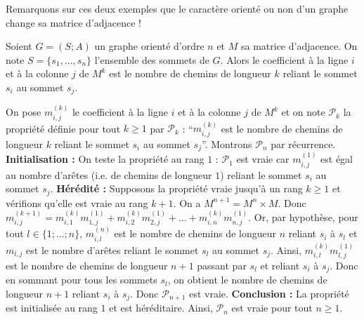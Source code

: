 	Remarquons sur ces deux exemples que le caractère orienté ou non d'un graphe change sa matrice d'adjacence !

	\begin{formula}
		Soient $G = (S; A)$ un graphe orienté d'ordre $n$ et $M$ sa matrice d'adjacence. On note $S = \{s_1, \dots, s_n\}$ l'ensemble des sommets de $G$.
		\newpar
		Alors le coefficient à la ligne $i$ et à la colonne $j$ de $M^k$ est le nombre de chemins de longueur $k$ reliant le sommet $s_i$ au sommet $s_j$.
	\end{formula}

	\begin{demonstration}
		On pose $m_{i,j}^{(k)}$ le coefficient à la ligne $i$ et à la colonne $j$ de $M^k$ et on note $\mathcal{P}_k$ la propriété définie pour tout $k \geq 1$ par $\mathcal{P}_k$ : ``$m_{i,j}^{(k)}$ est le nombre de chemins de longueur $k$ reliant le sommet $s_i$ au sommet $s_j$''. Montrons $\mathcal{P}_n$ par récurrence.
		\newpar
		\textbf{Initialisation :} On teste la propriété au rang $1$ :
		\newpar
		$\mathcal{P}_1$ est vraie car $m_{i,j}^{(1)}$ est égal au nombre d'arêtes (i.e. de chemins de longueur $1$) reliant le sommet $s_i$ au sommet $s_j$.
		\newpar
		\textbf{Hérédité :} Supposons la propriété vraie jusqu'à un rang $k \geq 1$ et vérifions qu'elle est vraie au rang $k+1$.
		\newpar
		On a $M^{n+1} = M^{n} \times M$. Donc $m_{i,j}^{(k+1)} = m_{i,1}^{(k)}m_{1,j}^{(1)} + m_{i,2}^{(k)}m_{2,j}^{(1)} + \dots + m_{i,n}^{(k)}m_{n,j}^{(1)}$.
		\newpar
		Or, par hypothèse, pour tout $l \in \{1; \dots; n\}$, $m_{i,l}^{(n)}$ est le nombre de chemins de longueur $n$ reliant $s_i$ à $s_l$ et $m_{l,j}$ est le nombre d'arêtes reliant le sommet $s_l$ au sommet $s_j$.
		\newpar
		Ainsi, $m_{i,l}^{(k)}m_{l,j}^{(1)}$ est le nombre de chemins de longueur $n+1$ passant par $s_l$ et reliant $s_i$ à $s_j$.
		\newpar
		Donc en sommant pour tous les sommets $s_l$, on obtient le nombre de chemins de longueur $n+1$ reliant $s_i$ à $s_j$. Donc $\mathcal{P}_{n+1}$ est vraie.
		\newpar
		\textbf{Conclusion :}
		\newpar
		La propriété est initialisée au rang $1$ et est héréditaire. Ainsi, $\mathcal{P}_n$ est vraie pour tout $n \geq 1$.
	\end{demonstration}

